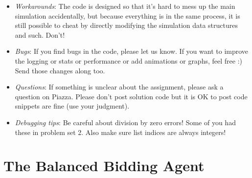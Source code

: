\documentclass[11pt]{article}
\begin{document}
\begin{description}
\begin{itemize}
\item {\em Workarounds}: The code is designed so that it's hard to mess up the main simulation accidentally, but because everything is in the same process, it is still possible to cheat by directly modifying the simulation data structures and such. Don't!
%
		\item {\em Bugs}: If you find bugs in the code,
please let us know. If you want to improve the logging or stats or performance or add animations or graphs, feel free :) Send those changes along too.
%
    		\item {\em Questions}:
If something is unclear about the assignment, please ask a question on Piazza. Please don't post solution code but it is OK
to post code snippets are fine (use your judgment).
\item {\em Debugging tips}: Be careful about division by zero errors! Some of you had these in problem set 2. Also make sure list indices are always integers!
    	\end{itemize}
	\end{description}
	

\section{The Balanced Bidding Agent}
\end{document}
